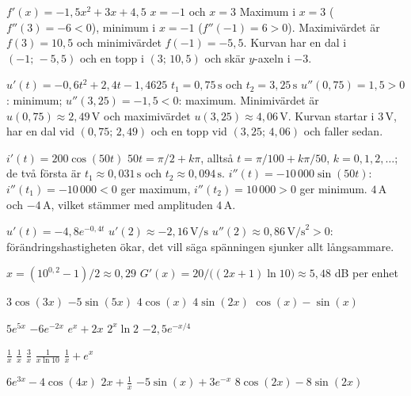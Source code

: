 
\begin{facit}

  $f'(x) = -1{,}5x^2 + 3x + 4{,}5$  $x = -1$ och $x = 3$
 Maximum i $x = 3$ ($f''(3) = -6 < 0$), minimum i $x = -1$ ($f''(-1) = 6 > 0$).
 Maximivärdet är $f(3) = 10{,}5$ och minimivärdet $f(-1) = -5{,}5$.
 Kurvan har en dal i $(-1;\, -5{,}5)$ och en topp i $(3;\, 10{,}5)$ och skär $y$-axeln i
$-3$.

  $u'(t) = -0{,}6t^2 + 2{,}4t - 1{,}4625$
 $t_1 = 0{,}75\,\text{s}$ och $t_2 = 3{,}25\,\text{s}$
 $u''(0{,}75) = 1{,}5 > 0$: minimum; $u''(3{,}25) = -1{,}5 < 0$: maximum.
 Minimivärdet är $u(0{,}75) \approx 2{,}49\,\text{V}$ och maximivärdet
$u(3{,}25) \approx 4{,}06\,\text{V}$.
 Kurvan startar i $3\,\text{V}$, har en dal vid $(0{,}75;\, 2{,}49)$ och en topp vid
$(3{,}25;\, 4{,}06)$ och faller sedan.

  $i'(t) = 200\cos(50t)$
 $50t = \pi/2 + k\pi$, alltså $t = \pi/100 + k\pi/50$,
$k = 0, 1, 2, \ldots$; de två första är $t_1 \approx 0{,}031\,\text{s}$ och
$t_2 \approx 0{,}094\,\text{s}$.
 $i''(t) = -10\,000\sin(50t)$: $i''(t_1) = -10\,000 < 0$ ger maximum,
$i''(t_2) = 10\,000 > 0$ ger minimum.
 $4\,\text{A}$ och $-4\,\text{A}$, vilket stämmer med amplituden $4\,\text{A}$.

  $u'(t) = -4{,}8e^{-0{,}4t}$  $u'(2) \approx -2{,}16\,\text{V/s}$
 $u''(2) \approx 0{,}86\,\text{V/s}^2 > 0$: förändringshastigheten ökar, det vill säga
spänningen sjunker allt långsammare.

  $x = (10^{0{,}2} - 1)/2 \approx 0{,}29$
 $G'(x) = 20/\bigl((2x + 1)\ln 10\bigr) \approx 5{,}48$ dB per enhet

  $3\cos(3x)$  $-5\sin(5x)$  $4\cos(x)$  $4\sin(2x)$
 $\cos(x) - \sin(x)$

  $5e^{5x}$  $-6e^{-2x}$  $e^x + 2x$  $2^x \ln 2$
 $-2{,}5e^{-x/4}$

  $\frac{1}{x}$  $\frac{1}{x}$  $\frac{3}{x}$
 $\frac{1}{x \ln 10}$  $\frac{1}{x} + e^x$

  $6e^{3x} - 4\cos(4x)$  $2x + \frac{1}{x}$  $-5\sin(x) + 3e^{-x}$
 $8\cos(2x) - 8\sin(2x)$


\end{facit}
